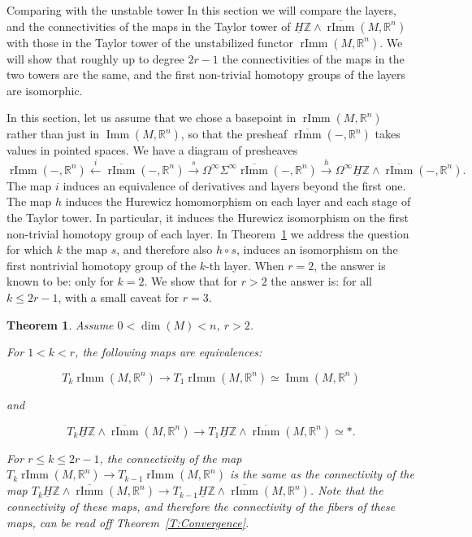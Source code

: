 \documentclass[12pt]{amsart}
\newcommand{\R}{{\mathbb R}}
\newcommand{\Z}{{\mathbb Z}}
\newcommand{\Imm}{\operatorname{Imm}}
\newcommand{\rImm}{\operatorname{rImm}}
\newcommand{\rbar}{\overline{\rImm}}
\newcommand{\HZ}{\underline{H}\Z}
\theoremstyle{plain}
\newtheorem{thm}{Theorem}[section]
\theoremstyle{definition}
\theoremstyle{remark}
\begin{document}
\vspace*{0.5cm}
\begin{section}{Comparing with the unstable tower}\label{section:compare}
In this section we will compare the layers, and the connectivities of the maps in the Taylor tower of $\HZ\wedge \rbar(M, \R^n)$ with those in the Taylor tower of the unstabilized functor $\rImm(M, \R^n)$. We will show that roughly up to degree $2r-1$ the connectivities of the maps in the two towers are the same, and the first non-trivial homotopy groups of the layers are isomorphic. %

In this section, let us assume that we chose a basepoint in $\rImm(M, \R^n)$ rather than just in $\Imm(M, \R^n)$, so that the presheaf $\rbar(-, \R^n)$ takes values in pointed spaces. We have a diagram of presheaves
\begin{equation}\label{eq: expanded comparison}
\rImm(-, \R^n)\xleftarrow{i} \rbar(-, \R^n) \xrightarrow{s}  \Omega^\infty \Sigma^\infty \rbar(-, \R^n) 
\xrightarrow{h} \Omega^\infty\HZ\wedge \rbar(-, \R^n).
\end{equation}
The map $i$ induces an equivalence of derivatives and layers beyond the first one. The map $h$ induces the Hurewicz homomorphism on each layer and each stage of the Taylor tower. In particular, it induces the Hurewicz isomorphism on the first non-trivial homotopy group of each layer. In Theorem~\ref{thm: comparison} we address the question for which $k$ the map $s$, and therefore also  $h\circ s$, induces an isomorphism on the first nontrivial homotopy group of the $k$-th layer. When $r=2$, the answer is known to be: only for $k=2$. We show that for $r>2$ the answer is: for all $k\le 2r-1$, with a small caveat for $r=3$.


\begin{thm}\label{thm: comparison}
Assume $0<\dim(M)<n$, $r>2$.

For $1< k < r$, the following maps are equivalences:

\[T_k\rImm(M, \R^n)\to T_1\rImm(M, \R^n)\simeq \Imm(M, \R^n)\]

and

\[T_k \HZ\wedge \rbar(M, \R^n)\to T_1 \HZ\wedge \rbar(M, \R^n) \simeq *.\]

For $r\le k \le 2r-1$, the connectivity of the map $T_k\rImm(M, \R^n)\to T_{k-1}\rImm(M, \R^n)$ is the same as the connectivity of the map $T_k\HZ\wedge \rbar(M, \R^n)\to T_{k-1}\HZ\wedge \rbar(M, \R^n)$. Note that the connectivity of these maps,  and therefore the connectivity of the fibers of these maps, can be read off Theorem~\ref{T:Convergence}.


\end{thm}
\end{section}
\end{document}
